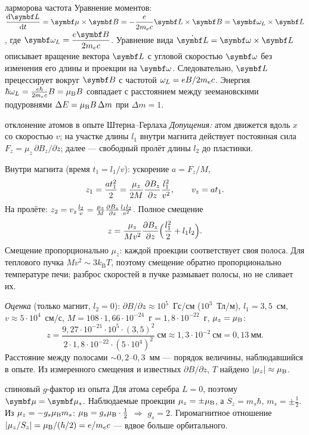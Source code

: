 \begin{derivation}[label=der:12:larmor]{ларморова частота}
Уравнение моментов: $\dfrac{\dd\vect L}{\dd t}=\vect\mu\times\vect B=-\dfrac{e}{2\mel c}\vect L\times\vect B=\vect\omega_L\times\vect L$,
где $\vect\omega_L=\dfrac{e\vect B}{2\mel c}$. Уравнение вида $\dot{\vect L}=\vect\omega\times\vect L$ описывает вращение вектора $\vect L$ с
угловой скоростью $\vect\omega$ без изменения его длины и проекции на $\vect\omega$. Следовательно, $\vect L$ прецессирует
вокруг $\vect B$ с частотой $\omega_L=eB/2m_e c$. Энергия $\hbar\omega_L=\frac{e\hbar}{2m_e c}B=\mu_{\mathrm B} B$ совпадает с
расстоянием между зеемановскими подуровнями $\Delta E=\mu_{\mathrm B} B\,\Delta m$ при $\Delta m=1$.
\end{derivation}

\begin{derivation}[label=der:12:sg]{отклонение атомов в опыте Штерна--Герлаха}
\emph{Допущения:} атом движется вдоль $x$ со скоростью $v$; на участке длины $l_1$ внутри магнита действует
постоянная сила $F_z=\mu_z\,\partial B_z/\partial z$; далее — свободный пролёт длины $l_2$ до пластинки.

Внутри магнита (время $t_1=l_1/v$): ускорение $a=F_z/M$,
\[
  z_1=\frac{a t_1^2}{2}=\frac{\mu_z}{2M}\frac{\partial B_z}{\partial z}\frac{l_1^2}{v^2},\qquad v_z=at_1 .
\]
На пролёте: $z_2=v_z\frac{l_2}{v}=\frac{\mu_z}{M}\frac{\partial B_z}{\partial z}\frac{l_1l_2}{v^2}$. Полное смещение
\[
  z=\frac{\mu_z}{Mv^2}\frac{\partial B_z}{\partial z}\Bigl(\frac{l_1^2}{2}+l_1l_2\Bigr).
\]
Смещение пропорционально $\mu_z$: каждой проекции соответствует своя полоса. Для теплового пучка $Mv^2\sim3k_{\mathrm B}T$, поэтому смещение обратно пропорционально температуре печи; разброс скоростей в пучке размывает полосы, но не сливает их.

\emph{Оценка} (только магнит, $l_2=0$): $\partial B/\partial z\approx10^5$~Гс/см ($10^3$~Тл/м), $l_1=3{,}5$~см,
$v\approx5\cdot10^4$~см/с, $M=108\cdot1{,}66\cdot10^{-24}$~г$=1{,}8\cdot10^{-22}$~г, $\mu_z=\mu_{\mathrm B}$:
\[
  z=\frac{9{,}27\cdot10^{-21}\cdot10^5\cdot(3{,}5)^2}{2\cdot1{,}8\cdot10^{-22}\cdot(5\cdot10^4)^2}\ \text{см}
  \approx1{,}3\cdot10^{-2}\ \text{см}=0{,}13\ \text{мм}.
\]
Расстояние между полосами $\sim0{,}2$--$0{,}3$~мм — порядок величины, наблюдавшийся в опыте. Из измеренного
смещения и известных $\partial B/\partial z$, $T$ найдено $|\mu_z|\approx\mu_{\mathrm B}$.
\end{derivation}

\begin{derivation}[label=der:12:gs]{спиновый $g$-фактор из опыта}
Для атома серебра $L=0$, поэтому $\vect\mu=\vect\mu_s$. Наблюдаемые проекции $\mu_z=\pm\mu_{\mathrm B}$, а $S_z=m_s\hbar$, $m_s=\pm\frac12$.
Из $\mu_z=-g_s\mu_{\mathrm B} m_s$: $\mu_{\mathrm B}=g_s\mu_{\mathrm B}\cdot\frac12$ $\Rightarrow$ $g_s=2$. Гиромагнитное отношение
$|\mu_z/S_z|=\mu_{\mathrm B}/(\hbar/2)=e/m_e c$ — вдвое больше орбитального.
\end{derivation}

